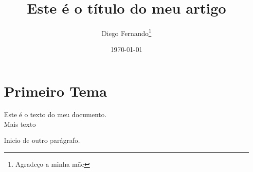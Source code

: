 \documentclass[12pt, a4paper]{article}
\title{Este é o título do meu artigo}
\author{Diego Fernando\thanks{Agradeço a minha mãe}}
\date{\today}
\begin{document}
	\begin{titlepage}
	\maketitle
	\end{titlepage}
	
	\begin{abstract}
	\lipsum[1]
	\end{abstract}
	
	\section{Primeiro Tema}

	Este é o texto do meu documento.\\
	Mais texto \par
	Inicio de outro parágrafo.
	
	\raggedright
	\lipsum[1]
	
	\raggedleft
	\lipsum[1]
	
	\justifying
	\lipsum
\end{document}
